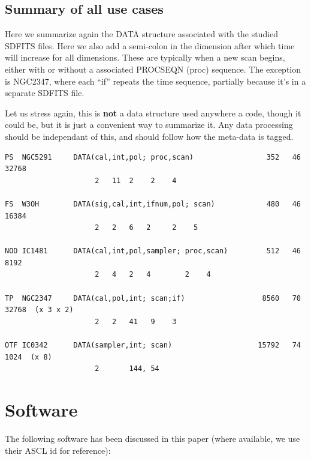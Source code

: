 \documentclass[12pt,a4paper]{article}
\begin{document}
\subsection{Summary of all use cases}

Here we summarize again the DATA structure associated with the studied
SDFITS files. Here we also add a semi-colon in the dimension after
which time will increase for all dimensions. These are typically when a new scan
begins, either with or without a associated PROCSEQN (proc) sequence. The
exception is NGC2347, where each ``if'' repeats the time sequence, partially
because it's in a separate SDFITS file.


Let us stress again, this is {\bf not} a data structure used anywhere
a code, though it could be, but it is just a convenient way to
summarize it. Any data processing should be independant of this, and
should follow how the meta-data is tagged.

\footnotesize
\begin{verbatim}
PS  NGC5291     DATA(cal,int,pol; proc,scan)                 352   46   32768
                     2   11  2    2    4

FS  W3OH        DATA(sig,cal,int,ifnum,pol; scan)            480   46   16384
                     2   2   6   2     2    5

NOD IC1481      DATA(cal,int,pol,sampler; proc,scan)         512   46    8192
                     2   4   2   4        2    4

TP  NGC2347     DATA(cal,pol,int; scan;if)                  8560   70   32768  (x 3 x 2)
                     2   2   41   9    3

OTF IC0342      DATA(sampler,int; scan)                    15792   74    1024  (x 8)
                     2       144, 54

\end{verbatim}
\normalsize

\newpage
\section{Software}

The following software has been discussed in this paper (where available, we use their ASCL id for reference):
\end{document}
